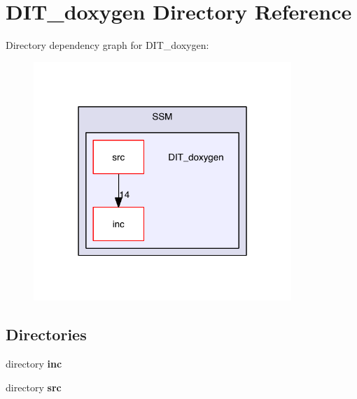 \section{D\-I\-T\-\_\-doxygen Directory Reference}
\label{dir_eaec92d7896823c82d2bba1199e530bd}
Directory dependency graph for D\-I\-T\-\_\-doxygen\-:
\nopagebreak
\begin{figure}[H]
\begin{center}
\leavevmode
\includegraphics[width=276pt]{dir_eaec92d7896823c82d2bba1199e530bd_dep}
\end{center}
\end{figure}
\subsection*{Directories}
\begin{DoxyCompactItemize}
\item 
directory {\bf inc}
\item 
directory {\bf src}
\end{DoxyCompactItemize}
